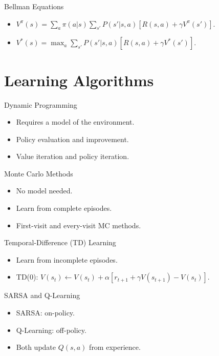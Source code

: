 \documentclass{beamer}
\begin{document}
\begin{frame}{Bellman Equations}
 \begin{itemize}
   \item $V^\pi(s) = \sum_a \pi(a|s) \sum_{s'} P(s'|s,a)[R(s,a) + \gamma V^\pi(s')]$.
   \item $V^*(s) = \max_a \sum_{s'} P(s'|s,a)[R(s,a) + \gamma V^*(s')]$.
 \end{itemize}
\end{frame}

\section{Learning Algorithms}
\begin{frame}{Dynamic Programming}
 \begin{itemize}
   \item Requires a model of the environment.
   \item Policy evaluation and improvement.
   \item Value iteration and policy iteration.
 \end{itemize}
\end{frame}

\begin{frame}{Monte Carlo Methods}
 \begin{itemize}
   \item No model needed.
   \item Learn from complete episodes.
   \item First-visit and every-visit MC methods.
 \end{itemize}
\end{frame}

\begin{frame}{Temporal-Difference (TD) Learning}
 \begin{itemize}
   \item Learn from incomplete episodes.
   \item TD(0): $V(s_t) \leftarrow V(s_t) + \alpha [r_{t+1} + \gamma V(s_{t+1}) - V(s_t)]$.
 \end{itemize}
\end{frame}

\begin{frame}{SARSA and Q-Learning}
 \begin{itemize}
   \item SARSA: on-policy.
   \item Q-Learning: off-policy.
   \item Both update $Q(s,a)$ from experience.
 \end{itemize}
\end{frame}
\end{document}
